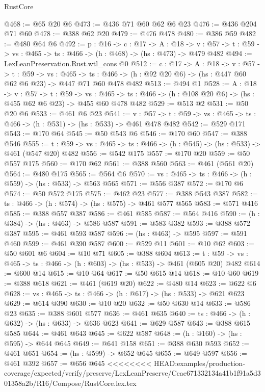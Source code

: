 \begin{lexlean}{RustCore}
\begin{coremodule}
{\begin{coremodule}
@468 := @65 @20 @6
@473 := @436 @71 @60 @62 @6 @23
@476 := @436 @204 @71 @60
@478 := @388 @62 @20
@479 := @476 @478
@480 := @386 @59
@482 := @480 @64 @6
@492 := {p : @16} ->
  {c : @17} ->
  {A : @18} ->
  {v : @57} -> {t : @59} -> {vs : @465} -> {ts : @466} -> (h : @468) -> (hs : @473) -> @479 @482
@494 := LexLeanPreservation.Rust.wtl_cons @0
@512 := {c : @17} ->
  {A : @18} ->
  {v : @57} ->
  {t : @59} ->
  {vs : @465} ->
  {ts : @466} -> (h : @92 @20 @6) -> (hs : @447 @60 @62 @6 @23) -> @447 @71 @60 @478 @482
@513 := @494 @1
@528 := {A : @18} ->
  {v : @57} ->
  {t : @59} ->
  {vs : @465} -> {ts : @466} -> (h : @108 @20 @6) -> (hs : @455 @62 @6 @23) -> @455 @60 @478 @482
@529 := @513 @2
@531 := @50 @20 @6
@533 := @461 @6 @23
@541 := {v : @57} ->
  {t : @59} -> {vs : @465} -> {ts : @466} -> (h : @531) -> (hs : @533) -> @461 @478 @482
@542 := @529 @171
@543 := @170 @64
@545 := @50 @543 @6
@546 := @170 @60
@547 := @388 @546
@555 := {t : @59} -> {vs : @465} -> {ts : @466} -> (h : @545) -> (hs : @533) -> @461 (@547 @20) @482
@556 := @542 @175
@557 := @170 @20
@559 := @50 @557 @175
@560 := @170 @62
@561 := @388 @560
@563 := @461 (@561 @20)
@564 := @480 @175
@565 := @564 @6
@570 := {vs : @465} -> {ts : @466} -> (h : @559) -> (hs : @533) -> @563 @565
@571 := @556 @387
@572 := @170 @6
@574 := @50 @572 @175
@575 := @462 @23
@577 := @388 @543 @387
@582 := {ts : @466} -> (h : @574) -> (hs : @575) -> @461 @577 @565
@583 := @571 @416
@585 := @388 @557 @387
@586 := @461 @585
@587 := @564 @416
@590 := (h : @384) -> (hs : @463) -> @586 @587
@591 := @583 @382
@593 := @388 @572 @387
@595 := @461 @593 @587
@596 := (hs : @463) -> @595
@597 := @591 @460
@599 := @461 @390 @587
@600 := @529 @11
@601 := @10 @62
@603 := @50 @601 @6
@604 := @10 @71
@605 := @388 @604
@613 := {t : @59} -> {vs : @465} -> {ts : @466} -> (h : @603) -> (hs : @533) -> @461 (@605 @20) @482
@614 := @600 @14
@615 := @10 @64
@617 := @50 @615 @14
@618 := @10 @60
@619 := @388 @618
@621 := @461 (@619 @20)
@622 := @480 @14
@623 := @622 @6
@628 := {vs : @465} -> {ts : @466} -> (h : @617) -> (hs : @533) -> @621 @623
@629 := @614 @390
@630 := @10 @20
@632 := @50 @630 @14
@633 := @586 @23
@635 := @388 @601 @577
@636 := @461 @635
@640 := {ts : @466} -> (h : @632) -> (hs : @633) -> @636 @623
@641 := @629 @587
@643 := @388 @615 @585
@644 := @461 @643
@645 := @622 @587
@648 := (h : @160) -> (hs : @595) -> @644 @645
@649 := @641 @158
@651 := @388 @630 @593
@652 := @461 @651
@654 := (hs : @599) -> @652 @645
@655 := @649 @597
@656 := @461 @392
@657 := @656 @645
<<<<<<<< HEAD:examples/production-coverage/expected/verify/preserve/LexLeanPreserve/Ccae671332134a41b1f91a5d301358a2b/R16/Compose/RustCore.lex.tex

\end{coremodule}}
\end{coremodule}
\end{lexlean}

